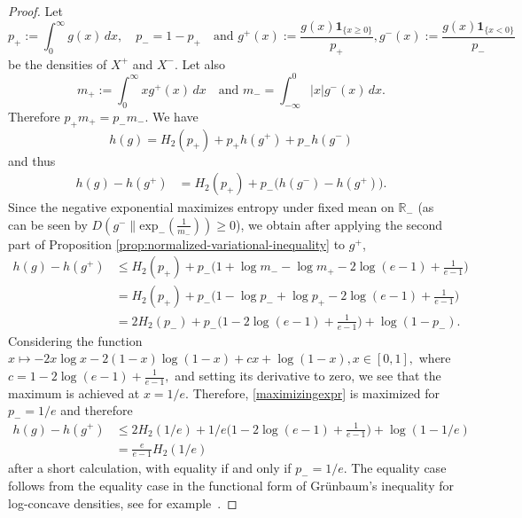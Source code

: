\documentclass{article}
\theoremstyle{plain}
\theoremstyle{definition}
\newcommand{\1}{\mathbf 1}
\begin{document}
\begin{proof}
 
Let
\[
        p_+ := \int_0^\infty g(x)\,dx,
        \quad p_- = 1-p_+ \quad \text{and }
        g^+(x):=\frac{g(x)\mathbf 1_{\{x\ge0\}}}{p_+}, g^-(x):=\frac{g(x)\mathbf 1_{\{x<0\}}}{p_-}
\]
be the densities of \(X^+\) and \(X^-\). Let also
\[
        m_+ := \int_0^\infty x g^+(x)\,dx \quad \text{and } m_- = \int_{-\infty}^0 |x| g^-(x)\,dx.
\]
Therefore $p_+m_+ = p_-m_-$. We have
$$
h(g) = H_2(p_+) + p_+h(g^+)+p_-h(g^-)
$$
and thus 
\begin{align}
    h(g)-h(g^+) &= H_2(p_+) + p_-\bigl(h(g^-) - h(g^+)\bigr).
\end{align}
Since the negative exponential maximizes entropy under fixed mean on $\mathbb R_-$ \cite[Example 12.2.5]{cover:book} (as can be seen by $D(g^-\|\mathrm{exp}_-(\frac{1}{m_-})) \geq 0$), we obtain after applying the second part of Proposition \ref{prop:normalized-variational-inequality} to $g^+$,
\begin{align}
    h(g)-h(g^+) &\leq H_2(p_+) + p_-\bigl( 1 + \log{{m_-}} - \log{m_+}-2\log{(e-1)} +\frac{1}{e-1}\bigr) \\
    &= H_2(p_+) + p_-\bigl( 1 -\log{p_-} + \log{p_+}-2\log{(e-1)} +\frac{1}{e-1}\bigr) \\ \label{maximizingexpr}
    &= 2H_2(p_-) + p_-\bigl( 1 -2\log{(e-1)} +\frac{1}{e-1}\bigr) + \log{(1-p_-)}.
\end{align}
Considering the function $x \mapsto -2x\log{x} -2(1-x)\log{(1-x)} + cx + \log{(1-x)}, x \in [0,1],$ where $c = 1-2\log{(e-1)} +\frac{1}{e-1},$ and setting its derivative to zero, we see that the maximum is achieved at $x = 1/e$. Therefore, \eqref{maximizingexpr} is maximized for $p_- = 1/e$ and therefore
\begin{align}
h(g)-h(g^+) &\leq 2H_2(1/e) + 1/e\bigl( 1 -2\log{(e-1)} +\frac{1}{e-1}\bigr) + \log{(1-1/e)} \\
&= \frac{e}{e-1}H_2(1/e)
\end{align}
after a short calculation, with equality if and only if $p_- = 1/e$. The equality case follows from the equality case in the functional form of Gr{\"u}nbaum's inequality for log-concave densities, see for example~\cite[Theorem 1.4.]{fradelizi2026grunbaum}.
\end{proof}
\end{document}
